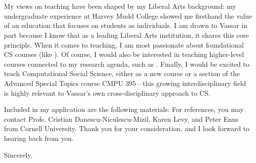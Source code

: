 \documentclass[12pt]{letter}
\begin{document}
\begin{letter}{
\department \\
\schoolnamelong \\
\schooladdress
}
My views on teaching have been shaped by my Liberal Arts background: my undergraduate experience at Harvey Mudd College showed me firsthand the value of an education that focuses on students as individuals.
I am drawn to Vassar in part because I know that as a leading Liberal Arts institution, it shares this core principle.
When it comes to teaching, I am most passionate about foundational CS courses (like \schoolintrocourses).
Of course, I would also be interested in teaching higher-level courses connected to my research agenda, such as \schooladvcourses.
Finally, I would be excited to teach Computational Social Science, either as a new course or a section of the Advanced Special Topics course CMPU 395---this growing interdisciplinary field is highly relevant to Vassar's own cross-disciplinary approach to CS.%

Included in my application are the following materials: \materials
For references, you may contact Profs. Cristian Danescu-Niculescu-Mizil, Karen Levy, and Peter Enns from Cornell University.
Thank you for your consideration, and I look forward to hearing back from you.

\closing{Sincerely,}

\end{letter}
\end{document}
